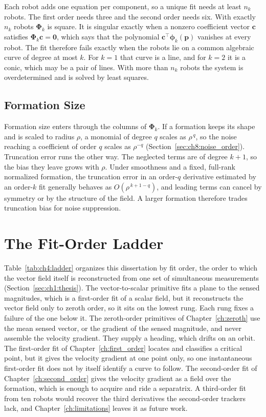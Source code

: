 Each robot adds one equation per component, so a unique fit needs at
least $n_k$ robots. The first order needs three and the second order
needs six. With exactly $n_k$ robots $\boldsymbol{\Phi}_k$ is square. It
is singular exactly when a nonzero coefficient vector $\mathbf{c}$
satisfies $\boldsymbol{\Phi}_k\mathbf{c} = \mathbf{0}$, which says that
the polynomial $\mathbf{c}^{\top}\boldsymbol{\phi}_k(\mathbf{p})$
vanishes at every robot. The fit therefore fails exactly when the robots
lie on a common algebraic curve of degree at most $k$. For $k = 1$ that
curve is a line, and for $k = 2$ it is a conic, which may be a pair of
lines. With more than $n_k$ robots the
system is overdetermined and is solved by least squares.

\subsection{Formation Size}
\label{sec:ch4:size}

Formation size enters through the columns of $\boldsymbol{\Phi}_k$. If a
formation keeps its shape and is scaled to radius $\rho$, a monomial of
degree $q$ scales as $\rho^{\,q}$, so the noise reaching a coefficient of
order $q$ scales as $\rho^{-q}$ (Section~\ref{sec:ch8:noise_order}).
Truncation error runs the other way. The neglected terms are of degree
$k + 1$, so the bias they leave grows with $\rho$. Under smoothness and a
fixed, full-rank normalized formation, the truncation error in an
order-$q$ derivative estimated by an order-$k$ fit generally behaves as
$O(\rho^{\,k+1-q})$, and leading terms can cancel by symmetry or by the
structure of the field. A larger formation therefore trades truncation
bias for noise suppression.

\section{The Fit-Order Ladder}
\label{sec:ch4:ladder}

Table~\ref{tab:ch4:ladder} organizes this dissertation by fit order, the
order to which the vector field itself is reconstructed from one set of
simultaneous measurements (Section~\ref{sec:ch1:thesis}). The
vector-to-scalar primitive fits a plane to the sensed magnitudes, which is
a first-order fit of a scalar field, but it reconstructs the vector field
only to zeroth order, so it sits on the lowest rung. Each rung fixes a
failure of the one below it. The zeroth-order primitives of
Chapter~\ref{ch:zeroth} use the mean sensed vector, or the gradient of
the sensed magnitude, and never assemble the velocity gradient. They
supply a heading, which drifts on an orbit. The first-order fit of
Chapter~\ref{ch:first_order} locates and classifies a critical point, but
it gives the velocity gradient at one point only, so one instantaneous
first-order fit does not by itself identify a curve to follow. The second-order fit of Chapter~\ref{ch:second_order} gives the
velocity gradient as a field over the formation, which is enough to
acquire and ride a separatrix. A third-order fit from ten robots would
recover the third derivatives the second-order trackers lack, and
Chapter~\ref{ch:limitations} leaves it as future work.

